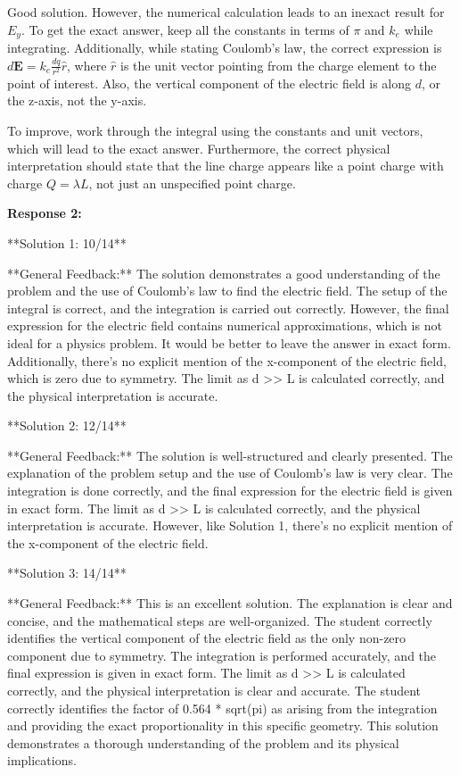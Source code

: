 \documentclass[a4paper,11pt]{article}
\begin{document}
Good solution. However, the numerical calculation leads to an inexact result for \( E_y \). To get the exact answer, keep all the constants in terms of \( \pi \) and \( k_e \) while integrating.
Additionally, while stating Coulomb's law, the correct expression is \( d\mathbf{E} = k_e \frac{dq}{r^2} \hat{r} \), where \( \hat{r} \) is the unit vector pointing from the charge element to the point of interest. Also, the vertical component of the electric field is along \( d \), or the z-axis, not the y-axis.

To improve, work through the integral using the constants and unit vectors, which will lead to the exact answer. Furthermore, the correct physical interpretation should state that the line charge appears like a point charge with charge \( Q = \lambda L \), not just an unspecified point charge.


\textbf{Response 2:}

**Solution 1: 10/14**

**General Feedback:** The solution demonstrates a good understanding of the problem and the use of Coulomb's law to find the electric field. The setup of the integral is correct, and the integration is carried out correctly. However, the final expression for the electric field contains numerical approximations, which is not ideal for a physics problem. It would be better to leave the answer in exact form. Additionally, there's no explicit mention of the x-component of the electric field, which is zero due to symmetry. The limit as d >> L is calculated correctly, and the physical interpretation is accurate.

**Solution 2: 12/14**

**General Feedback:** The solution is well-structured and clearly presented. The explanation of the problem setup and the use of Coulomb's law is very clear. The integration is done correctly, and the final expression for the electric field is given in exact form. The limit as d >> L is calculated correctly, and the physical interpretation is accurate. However, like Solution 1, there's no explicit mention of the x-component of the electric field.

**Solution 3: 14/14**

**General Feedback:** This is an excellent solution. The explanation is clear and concise, and the mathematical steps are well-organized. The student correctly identifies the vertical component of the electric field as the only non-zero component due to symmetry. The integration is performed accurately, and the final expression is given in exact form. The limit as d >> L is calculated correctly, and the physical interpretation is clear and accurate. The student correctly identifies the factor of 0.564 * sqrt(pi) as arising from the integration and providing the exact proportionality in this specific geometry. This solution demonstrates a thorough understanding of the problem and its physical implications.
\end{document}
